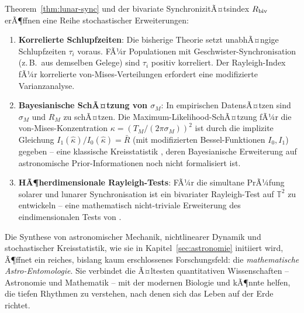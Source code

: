 ﻿\documentclass[12pt, a4paper]{article}
\theoremstyle{definition}
\begin{document}
Theorem~\ref{thm:lunar-sync} und der bivariate SynchronizitÃ¤tsindex $R_{\rm biv}$
erÃ¶ffnen eine Reihe stochastischer Erweiterungen:

\begin{enumerate}
  \item \textbf{Korrelierte Schlupfzeiten}: Die bisherige Theorie setzt unabhÃ¤ngige
        Schlupfzeiten $\tau_i$ voraus. FÃ¼r Populationen mit Geschwister-Synchronisation
        (z.\,B.\ aus demselben Gelege) sind $\tau_i$ positiv korreliert. Der
        Rayleigh-Index fÃ¼r korrelierte von-Mises-Verteilungen erfordert eine
        modifizierte Varianzanalyse.

  \item \textbf{Bayesianische SchÃ¤tzung von $\sigma_M$}: In empirischen DatensÃ¤tzen
        sind $\sigma_M$ und $R_M$ zu schÃ¤tzen. Die Maximum-Likelihood-SchÃ¤tzung
        fÃ¼r die von-Mises-Konzentration $\kappa = (T_M/(2\pi\sigma_M))^2$ ist
        durch die implizite Gleichung $I_1(\hat\kappa)/I_0(\hat\kappa) = \bar{R}$
        (mit modifizierten Bessel-Funktionen $I_0, I_1$) gegeben -- eine
        klassische Kreisstatistik \cite{Mardia1972}, deren Bayesianische
        Erweiterung auf astronomische Prior-Informationen noch nicht formalisiert ist.

  \item \textbf{HÃ¶herdimensionale Rayleigh-Tests}: FÃ¼r die simultane PrÃ¼fung
        solarer und lunarer Synchronisation ist ein bivariater Rayleigh-Test
        auf $\mathbb{T}^2$ zu entwickeln -- eine mathematisch nicht-triviale
        Erweiterung des eindimensionalen Tests von \cite{Mardia1972}.
\end{enumerate}

Die Synthese von astronomischer Mechanik, nichtlinearer Dynamik und stochastischer
Kreisstatistik, wie sie in Kapitel~\ref{sec:astronomie} initiiert wird, Ã¶ffnet
ein reiches, bislang kaum erschlossenes Forschungsfeld: die \emph{mathematische
Astro-Entomologie}. Sie verbindet die Ã¤ltesten quantitativen Wissenschaften --
Astronomie und Mathematik -- mit der modernen Biologie und kÃ¶nnte helfen,
die tiefen Rhythmen zu verstehen, nach denen sich das Leben auf der Erde richtet.
\end{document}
